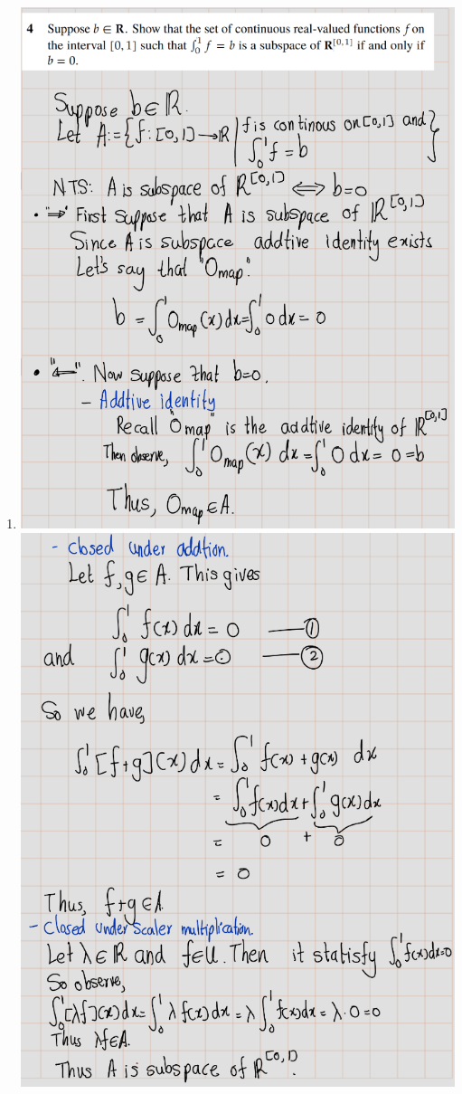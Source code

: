 \documentclass[
]{book}
\providecommand{\tightlist}{%
  \setlength{\itemsep}{0pt}\setlength{\parskip}{0pt}}
\theoremstyle{definition}
\theoremstyle{definition}
\theoremstyle{definition}
\theoremstyle{definition}
\theoremstyle{remark}
\begin{document}
\begin{enumerate}
\def\labelenumi{\arabic{enumi}.}
\setcounter{enumi}{3}
\tightlist
\item
  \hfill\break
  \includegraphics{fig/Ex1C/Ex4.png}
  \includegraphics{fig/Ex1C/Ex4-2.png}

\end{enumerate}
\end{document}
